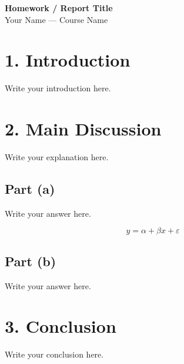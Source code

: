 \documentclass[11pt,letterpaper]{article}
\begin{document}
{\LARGE\bfseries Homework / Report Title}\\[5pt]
{\large Your Name --- Course Name}

\section*{1. Introduction}
Write your introduction here.

\section*{2. Main Discussion}
Write your explanation here.

\subsection*{Part (a)}
Write your answer here.

\begin{equation}
    y = \alpha + \beta x + \varepsilon
\end{equation}

\subsection*{Part (b)}
Write your answer here.

\section*{3. Conclusion}
Write your conclusion here.

% 
% 
\end{document}
